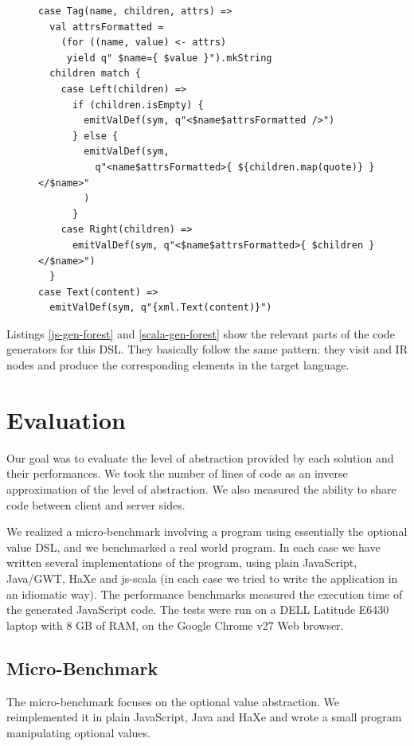 \documentclass[preprint]{sigplanconf}
\begin{document}
\begin{figure}
\begin{lstlisting}[label=scala-gen-forest,caption=Scala code generator for the DOM fragment
definition DSL,basicstyle=\ssmall]
case Tag(name, children, attrs) =>
  val attrsFormatted =
    (for ((name, value) <- attrs)
     yield q" $name={ $value }").mkString
  children match {
    case Left(children) =>
      if (children.isEmpty) {
        emitValDef(sym, q"<$name$attrsFormatted />")
      } else {
        emitValDef(sym,
          q"<name$attrsFormatted>{ ${children.map(quote)} }</$name>"
        )
      }
    case Right(children) =>
      emitValDef(sym, q"<$name$attrsFormatted>{ $children }</$name>")
  }
case Text(content) =>
  emitValDef(sym, q"{xml.Text(content)}")
\end{lstlisting}
\end{figure}

Listings \ref{js-gen-forest} and \ref{scala-gen-forest} show the relevant parts of the code
generators for this DSL. They basically follow the same pattern: they visit  and
 IR nodes and produce the corresponding elements in the target language.


\section{Evaluation}
\label{sec:validation}

Our goal was to evaluate the level of abstraction provided by each solution and their performances.
We took the number of lines of code as an inverse approximation of the level of abstraction. We also
measured the ability to share code between client and server sides.

We realized a micro-benchmark involving a program using essentially the optional value DSL, and we
benchmarked a real world program. In each case we have written several implementations of the
program, using plain JavaScript, Java/GWT, HaXe and js-scala (in each case we tried to write the
application in an idiomatic way). The performance benchmarks measured the execution time of the
generated JavaScript code. The tests were run on a DELL Latitude E6430 laptop with 8 GB of RAM, on
the Google Chrome v27 Web browser.

\subsection{Micro-Benchmark}

The micro-benchmark focuses on the optional value abstraction. We reimplemented it in plain
JavaScript, Java and HaXe and wrote a small program manipulating optional values.
\end{document}
